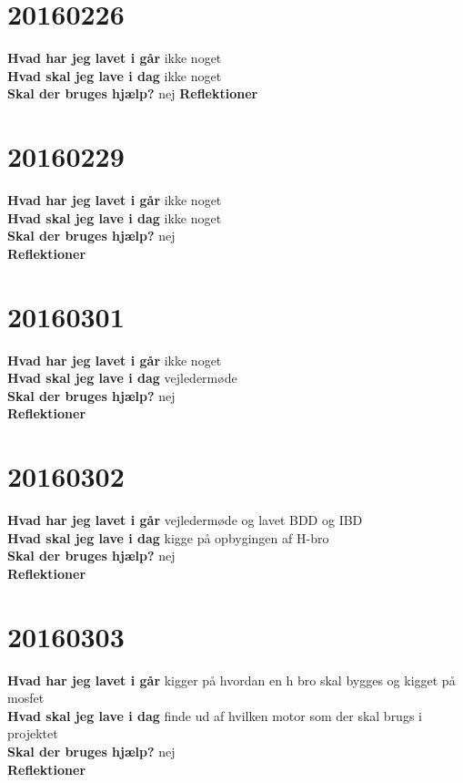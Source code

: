 \documentclass{article}
\begin{document}
			\section{20160226}
			
			\textbf{Hvad har jeg lavet i går}
		ikke noget
			\\
			\textbf{Hvad skal jeg lave i dag}
			ikke noget
			\\
			\textbf{Skal der bruges hjælp?}
			nej
			\textbf{Reflektioner}
			
			\section{20160229}
			
			\textbf{Hvad har jeg lavet i går}
			ikke noget
			\\
			\textbf{Hvad skal jeg lave i dag}
			ikke noget
			\\
			\textbf{Skal der bruges hjælp?}
			nej
			\\
			\textbf{Reflektioner}
			
			\section{20160301}
			
			\textbf{Hvad har jeg lavet i går}
			ikke noget
			\\
			\textbf{Hvad skal jeg lave i dag}
			vejledermøde
			\\
			\textbf{Skal der bruges hjælp?}
			nej
			\\
			\textbf{Reflektioner}
			
				\section{20160302}
				
				\textbf{Hvad har jeg lavet i går}
				vejledermøde og lavet BDD og IBD
				\\
				\textbf{Hvad skal jeg lave i dag}
				kigge på opbygingen af H-bro
				\\
				\textbf{Skal der bruges hjælp?}
				nej
				\\
				\textbf{Reflektioner}
					\section{20160303}
					
			\textbf{Hvad har jeg lavet i går}
					kigger på hvordan en h bro skal bygges og kigget på mosfet	\\
					\textbf{Hvad skal jeg lave i dag}
					finde ud af hvilken motor som der skal brugs i projektet
					\\
					\textbf{Skal der bruges hjælp?}
					nej
					\\
					\textbf{Reflektioner}
\end{document}
